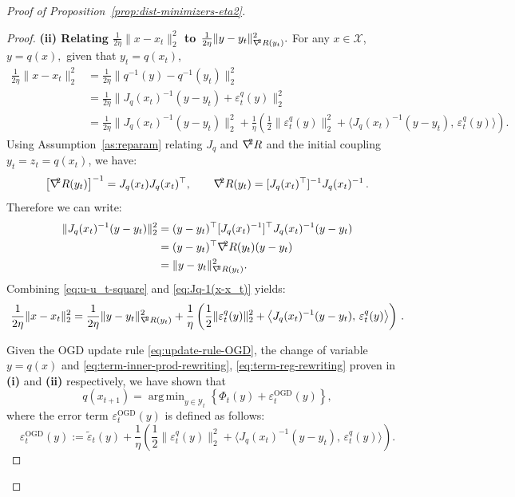 \documentclass[a4paper,11pt,fullpage]{article}
\def\X{{\mathcal X}}
\def\Y{{\mathcal Y}}
\theoremstyle{plain}
\theoremstyle{definition}
\theoremstyle{plain}
\DeclareMathOperator*{\argmin}{arg\,min}
\let\nablaold\nabla
\renewcommand{\nabla}{\nablaold\mkern-2.5mu}
\begin{document}
\begin{proof}[Proof of Proposition~\ref{prop:dist-minimizers-eta2}]
\begin{proof}
\noindent\textbf{(ii) Relating $\frac{1}{2\eta}\|x-x_t\|_2^2$ to $\frac{1}{2\eta} \|y-y_t\|_{\nabla^2 R(y_t)}^2.$} For any $x \in \X$, $y = q(x),$ given that $y_t = q(x_t)$,  
\begin{align}
\label{eq:u-u_t-square}
\frac{1}{2\eta}\|x-x_t\|_2^2
&= \frac{1}{2\eta}\|q^{-1}(y)-q^{-1}(y_t)\|_2^2 \nonumber\\
&= \frac{1}{2\eta}\|J_q(x_t)^{-1}(y-y_t) + \varepsilon_t^q(y)\|_2^2 \nonumber\\
&= \frac{1}{2\eta}\|J_q(x_t)^{-1}(y-y_t)\|_2^2
+ \frac{1}{\eta} \left(\frac12\|\varepsilon_t^q(y)\|_2^2
+\big\langle J_q(x_t)^{-1}(y-y_t),\,\varepsilon_t^q(y)\big\rangle\right).
\end{align}
Using Assumption~\ref{as:reparam} relating $J_q$ and $\nabla^2R$ and the initial coupling $y_t = z_t = q(x_t)$, we have: 
\begin{equation*}
\big[\nabla^2R(y_t)\big]^{-1}=J_q(x_t)J_q(x_t)^\top,
\qquad
\nabla^2R(y_t)=[J_q(x_t)^{\top}]^{-1}J_q(x_t)^{-1}\,.
\end{equation*}
Therefore we can write: 
\begin{align}
\label{eq:Jq-1(x-x_t)}
\|J_q(x_t)^{-1}(y-y_t)\|_2^2
&= (y-y_t)^{\top} [J_q(x_t)^{-1}]^{\top} J_q(x_t)^{-1}(y-y_t) \nonumber\\
&= (y-y_t)^{\top} \nabla^2R(y_t)(y-y_t) \nonumber\\
&= \|y-y_t\|^2_{\nabla^2R(y_t)}.
\end{align}
Combining \eqref{eq:u-u_t-square} and \eqref{eq:Jq-1(x-x_t)} yields: 
\begin{equation*}
\label{eq:term-reg-rewriting}
\frac{1}{2\eta}\|x-x_t\|_2^2 = \frac{1}{2\eta} \|y-y_t\|^2_{\nabla^2R(y_t)} 
+ \frac{1}{\eta} \left(\frac12\|\varepsilon_t^q(y)\|_2^2
+\big\langle J_q(x_t)^{-1}(y-y_t),\,\varepsilon_t^q(y)\big\rangle\right)\,.
\end{equation*}

Given the OGD update rule \eqref{eq:update-rule-OGD}, the change of variable $y = q(x)$ and \eqref{eq:term-inner-prod-rewriting}, \eqref{eq:term-reg-rewriting} proven in \textbf{(i)} and \textbf{(ii)} respectively, we have shown that 
\begin{equation*}
q(x_{t+1})
=
\argmin_{y\in \Y_t}
\left\{
\Phi_t(y)+\varepsilon_t^{\mathrm{OGD}}(y)
\right\},
\end{equation*}
where the error term $\varepsilon_t^{\mathrm{OGD}}(y)$ is defined as follows: 
\begin{equation}
\label{eq:eps-OGD}
\varepsilon_t^{\mathrm{OGD}}(y)
:=
\tilde\varepsilon_t(y)
+
\frac{1}{\eta}
\left(
\frac12\|\varepsilon_t^q(y)\|_2^2
+
\big\langle J_q(x_t)^{-1}(y-y_t),\,\varepsilon_t^q(y)\big\rangle
\right).
\end{equation}
\end{proof}


\end{proof}
\end{document}
